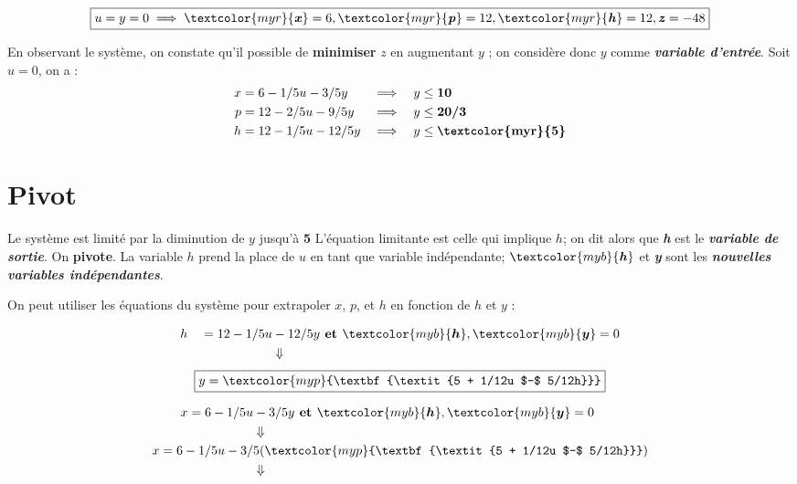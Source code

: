\documentclass{report}
\begin{document}
\begin{multicols*}{2}
\begin{align*}
\boxed{u = y = 0 \implies 
\textcolor{myr}{\textbf{\textit{x}}}  = 6, 
\textcolor{myr}{\textbf{\textit{p}}} = 12,
\textcolor{myr}{\textbf{\textit{h}}} = 12,
\textbf{\textit{z}} = -48}
\end{align*}

En observant le système, on constate qu'il possible de 
\textbf{minimiser} $z$ en augmentant $y$ ; on considère 
donc $y$ comme \textcolor{myb}{\textbf{\textit{variable d'entrée}}}. Soit 
$u = 0$, on a :
\begin{align*}
    x &= 6 - 1/5u -3/5y& 
    \implies \quad 
    & y \leq \textbf{10}  
    \\
    p &= 12 - 2/5u -9/5y 
      & \implies \quad  &  y \leq \textbf{20/3}
    \\
    h &= 12 - 1/5u -12/5y&
    \implies \quad & y \leq \textbf{\textcolor{myr}{5}} 
\end{align*}

\section{Pivot}
Le système est limité par la diminution de $y$ jusqu'à \textcolor{myr}{\textbf{5}} 
L'équation limitante est celle qui implique $h$; on dit alors que 
\textcolor{myr}{\textbf{\textit{h}}} est le 
\textcolor{myr}{\textbf{\textit{variable de sortie}}}. On 
\textbf{pivote}. La variable $h$ prend la place de $u$ en tant que
variable indépendante;
$\textcolor{myb}{\textbf{\textit{h}}}$ et  
\textcolor{myb}{\textbf{\textit{y}}} sont les 
\textcolor{myb}{\textbf{\textit{nouvelles variables indépendantes}}}.   

On peut utiliser les équations du système pour extrapoler 
$x$, $p$, et $h$ en fonction de $h$ et $y$ :


\begin{align*}
    h \quad = 12 - 1/5u &-12/5y
    \textbf{ et } \textcolor{myb}{\boldsymbol{h}}, \textcolor{myb}{\boldsymbol{y}}  = 0 
    \\
                 &\Downarrow
\end{align*}
      \[%
    \boxed{y = \textcolor{myp}{\textbf{\textit{5 + 1/12u $-$ 5/12h}}} }
      \]%


\begin{align*}
    x = 6 - 1/5u &-3/5y 
    \textbf{ et } \textcolor{myb}{\boldsymbol{h}}, \textcolor{myb}{\boldsymbol{y}}  = 0
    \\
      &\Downarrow
    \\ 
    x = 6 - 1/5u -3/&5(\textcolor{myp}{\textbf{\textit{5 + 1/12u $-$ 5/12h}}}) 
    \\
                    &\Downarrow
\end{align*}


\end{multicols*}
\end{document}
